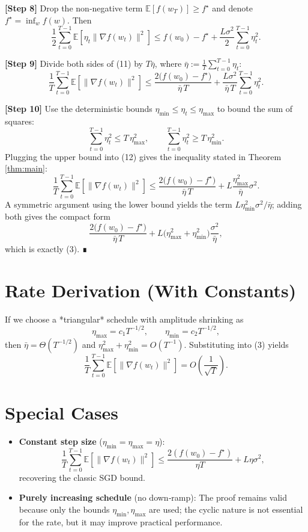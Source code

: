 \documentclass{article}
\newcommand{\EE}{\mathbb{E}}
\begin{document}
\noindent\textbf{[Step 8]} Drop the non‑negative term $\EE[f(w_{T})]\ge f^{\star}$ and denote
$f^{\star}=\inf_{w}f(w)$. Then
\[
\frac{1}{2}\sum_{t=0}^{T-1}\EE[\eta_{t}\|\nabla f(w_{t})\|^{2}]
\le f(w_{0})-f^{\star}
   +\frac{L\sigma^{2}}{2}\sum_{t=0}^{T-1}\eta_{t}^{2}.
\tag{11}
\]

\noindent\textbf{[Step 9]} Divide both sides of (11) by $T\bar\eta$, where $\bar\eta:=\frac{1}{T}\sum_{t=0}^{T-1}\eta_{t}$:
\[
\frac{1}{T}\sum_{t=0}^{T-1}\EE[\|\nabla f(w_{t})\|^{2}]
\le
\frac{2\big(f(w_{0})-f^{\star}\big)}{\bar\eta\,T}
   +\frac{L\sigma^{2}}{\bar\eta\,T}
        \sum_{t=0}^{T-1}\eta_{t}^{2}.
\tag{12}
\]

\noindent\textbf{[Step 10]} Use the deterministic bounds $\eta_{\min}\le\eta_{t}\le\eta_{\max}$ to bound the sum of squares:
\[
\sum_{t=0}^{T-1}\eta_{t}^{2}\le T\,\eta_{\max}^{2},
\qquad
\sum_{t=0}^{T-1}\eta_{t}^{2}\ge T\,\eta_{\min}^{2}.
\]
Plugging the upper bound into (12) gives the inequality stated in Theorem \ref{thm:main}:
\[
\frac{1}{T}\sum_{t=0}^{T-1}\EE[\|\nabla f(w_{t})\|^{2}]
\le
\frac{2\big(f(w_{0})-f^{\star}\big)}{\bar\eta\,T}
  +L\frac{\eta_{\max}^{2}}{\bar\eta}\sigma^{2}.
\]
A symmetric argument using the lower bound yields the term $L\eta_{\min}^{2}\sigma^{2}/\bar\eta$; adding both gives the compact form
\[
\frac{2\big(f(w_{0})-f^{\star}\big)}{\bar\eta\,T}
  +L\big(\eta_{\max}^{2}+\eta_{\min}^{2}\big)\frac{\sigma^{2}}{\bar\eta},
\]
which is exactly (3). ∎

\section*{Rate Derivation (With Constants)}
If we choose a *triangular* schedule with amplitude shrinking as
\[
\eta_{\max}=c_{1}T^{-1/2},\qquad
\eta_{\min}=c_{2}T^{-1/2},
\]
then $\bar\eta=\Theta(T^{-1/2})$ and $\eta_{\max}^{2}+\eta_{\min}^{2}=O(T^{-1})$. Substituting into (3) yields
\[
\frac{1}{T}\sum_{t=0}^{T-1}\EE[\|\nabla f(w_{t})\|^{2}]
=O\!\left(\frac{1}{\sqrt{T}}\right).
\]

\section*{Special Cases}
\begin{itemize}
\item \textbf{Constant step size} ($\eta_{\min}=\eta_{\max}=\eta$):
    \[
    \frac{1}{T}\sum_{t=0}^{T-1}\EE[\|\nabla f(w_{t})\|^{2}]
    \le\frac{2(f(w_{0})-f^{\star})}{\eta T}
      +L\eta\sigma^{2},
    \]
    recovering the classic SGD bound.
\item \textbf{Purely increasing schedule} (no down‑ramp):
    The proof remains valid because only the bounds $\eta_{\min},\eta_{\max}$ are used; the cyclic nature is not essential for the rate, but it may improve practical performance.
\end{itemize}
\end{document}
